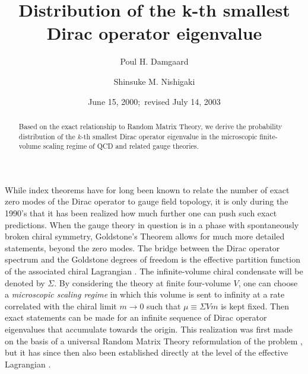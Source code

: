 \draft
\title{
Distribution of the k-th smallest Dirac operator eigenvalue
}
\author{Poul H. Damgaard}
\address{
The Niels Bohr Institute, Blegdamsvej 17, DK-2100 Copenhagen \O,
Denmark 
}
\author{Shinsuke M. Nishigaki}
\address{
Department of Physics,
Tokyo Institute of Technology,
O-okayama, Meguro, Tokyo 152-8551, Japan
}
\date{June 15, 2000;\ revised July 14, 2003}
\maketitle
\begin{abstract} 
Based on the exact relationship to
Random Matrix Theory, we derive
the probability distribution of the $k$-th smallest Dirac operator
eigenvalue in the microscopic finite-volume scaling regime of QCD
and related gauge theories.
\end{abstract}
\renewcommand{\thefootnote}{\fnsymbol{footnote}}
\setcounter{footnote}{0}
\narrowtext
While index theorems have for long been known to relate the number of
exact zero modes of the Dirac operator to
gauge field topology, it is only during the 1990's that it has been
realized how much further one can push such exact predictions. When
the gauge theory in question is in a phase with spontaneously broken
chiral symmetry, Goldstone's Theorem allows for much more detailed
statements, beyond the zero modes. The bridge between the
Dirac operator spectrum and the Goldstone degrees of freedom is the
effective partition function of the associated chiral Lagrangian
\cite{LS,SmV}. The infinite-volume chiral condensate will be denoted
by $\Sigma$.
By considering the theory at finite four-volume $V$, one
can choose a {\em microscopic scaling regime} in which this volume is sent
to infinity at a rate correlated with the chiral limit
$m \to 0$ such that $\mu\equiv \Sigma V m$ is kept fixed.
Then exact statements can be made for an infinite sequence of Dirac
operator eigenvalues that accumulate towards the origin. This realization
was first made on the basis of a universal Random Matrix Theory
reformulation of the problem \cite{ShV,V,HV,VW},
but it has since then
also been established directly at the level of the effective Lagrangian
\cite{D,OTV}. 

